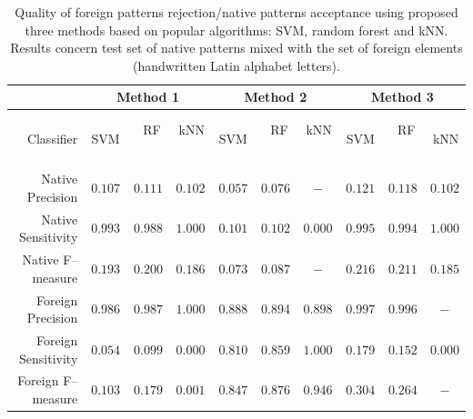 \documentclass{llncs}
\begin{document}
\begin{table}[!b]
	\vspace{-12pt}
	\centering
	\caption{ Quality of foreign patterns rejection/native patterns acceptance using proposed three methods based on popular algorithms: SVM, random forest and kNN. Results concern test set of native patterns mixed with the set of foreign elements (handwritten Latin alphabet letters).}
	\vspace{-6pt}
	\setlength{\tabcolsep}{5pt}
	\renewcommand{\arraystretch}{1}
	\footnotesize
	{
		\begin{tabular}{|r||c|c|c||c|c|c||c|c|c|}
			\hline
			& \multicolumn{3}{c||}{Method 1} & \multicolumn{3}{c||}{Method 2} & \multicolumn{3}{c|}{Method 3}\\
			\hline
			Classifier & $\;\;$SVM$\;\;$ & $\;\;$RF$\;\;$ & $\,$kNN$\;\;$ & $\,$SVM$\;\;$ & $\;\;$RF$\;\;$ & $\,$kNN$\;\;$ & $\,$SVM$\;\;$ & $\;\;$RF$\;\;$ & $\,$kNN  \\
			\hline
			Native Precision       & $0.107$ & $0.111$ & $0.102 $ & $0.057$ & $0.076$ & $-$ & $0.121$ & $0.118$ & $0.102$ \\
			Native Sensitivity & $0.993$ & $0.988$ & $1.000$ & $0.101$ & $0.102$ & $0.000$ & $0.995$ & $0.994$ & $1.000$ \\
			Native F--measure & $0.193$ & $0.200$ & $0.186$ & $0.073$ & $0.087$ & $-$ & $0.216$ & $0.211$ & $0.185$ \\
			Foreign Precision & $0.986$ & $0.987$ & $1.000$ & $0.888$ & $0.894$ & $0.898$ & $0.997$ & $0.996$ & $-$ \\
			Foreign Sensitivity & $0.054$ & $0.099$ & $0.000$ & $0.810$ & $0.859$ & $1.000$ & $0.179$ & $0.152$ & $0.000$ \\
			Foreign F--measure & $0.103$ & $0.179$ & $0.001$ & $0.847$ & $0.876$ & $0.946$ & $0.304$ & $0.264$ & $-$ \\			
			\hline
		\end{tabular}	
	}
	\vspace{-0pt}
	\label{tab:results_rejection_standard}
\end{table}
\end{document}

